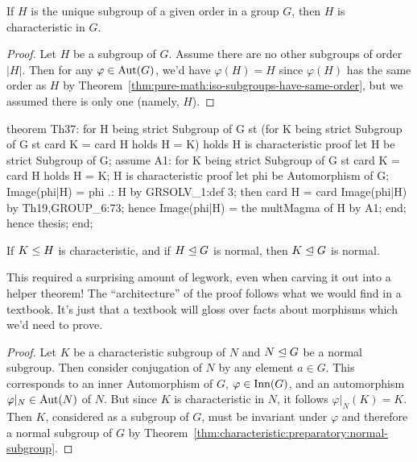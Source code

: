 \begin{theorem}
  If $H$ is the unique subgroup of a given order in a group $G$,
  then $H$ is characteristic in $G$.
\end{theorem}

\begin{proof}
Let $H$ be a subgroup of $G$. Assume there are no other subgroups of
order $|H|$. Then for any $\varphi\in\operatorname{Aut}(G)$, we'd have $\varphi(H)=H$
since $\varphi(H)$ has the same order as $H$ by
Theorem~\ref{thm:pure-math:iso-subgroups-have-same-order}, but we
assumed there is only one (namely, $H$).
\end{proof}

\nwenddocs{}\endmoddef\nwstartdeflinemarkup{}\nwenddeflinemarkup
theorem Th37:
  for H being strict Subgroup of G
  st (for K being strict Subgroup of G
      st card K = card H
      holds H = K)
  holds H is characteristic
proof
  let H be strict Subgroup of G;
  assume A1: for K being strict Subgroup of G st card K = card H holds H = K;
  H is characteristic
  proof
    let phi be Automorphism of G;
    Image(phi|H) = phi .: H by GRSOLV_1:def 3;
    then card H = card Image(phi|H) by Th19,GROUP_6:73;
    hence Image(phi|H) = the multMagma of H by A1;
  end;
  hence thesis;
end;
\eatline
{}\nwendcode{}\nwdocspar
\begin{theorem}
If $K\leq H$ is characteristic, and if $H\trianglelefteq G$ is normal,
then $K\trianglelefteq G$ is normal.
\end{theorem}

This required a surprising amount of legwork, even when carving it out
into a helper theorem! The ``architecture'' of the proof follows what we
would find in a textbook. It's just that a textbook will gloss over
facts about morphisms which we'd need to prove.

\begin{proof}
Let $K$ be a characteristic subgroup of $N$ and $N\trianglelefteq G$ be
a normal subgroup. Then consider conjugation of $N$ by any element $a\in G$.
This corresponds to an inner Automorphism of $G$, $\varphi\in\operatorname{Inn}(G)$, and an
automorphism $\varphi|_{N}\in\operatorname{Aut}(N)$ of $N$. But since $K$ is
characteristic in $N$, it follows $\varphi|_{N}(K)=K$. Then $K$,
considered as a subgroup of $G$, must be invariant under $\varphi$ and
therefore a normal subgroup of $G$ by Theorem~\ref{thm:characteristic:preparatory:normal-subgroup}.
\end{proof}

